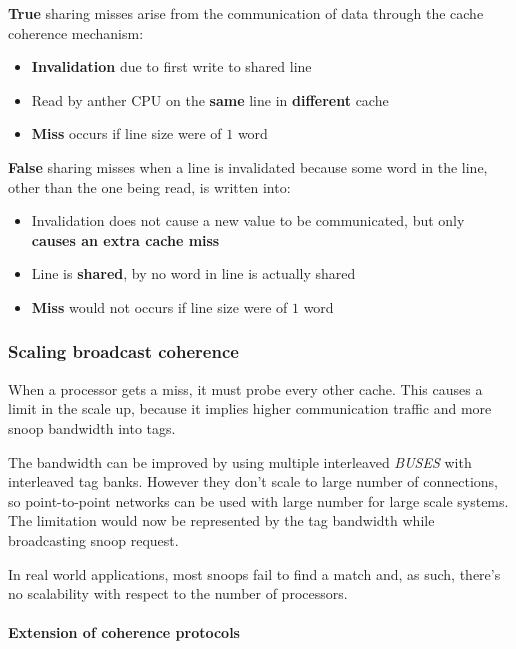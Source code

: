 \documentclass[english]{article}
\begin{document}
\bigskip
\textbf{True} sharing misses arise from the communication of data through the cache coherence mechanism:

\begin{itemize}
  \item \textbf{Invalidation} due to first write to shared line
  \item Read by anther CPU on the \textbf{same} line in \textbf{different} cache
  \item \textbf{Miss} occurs if line size were of \(1\) word
\end{itemize}

\textbf{False} sharing misses when a line is invalidated because some word in the line, other than the one being read, is written into:

\begin{itemize}
  \item Invalidation does not cause a new value to be communicated, but only \textbf{causes an extra cache miss}
  \item Line is \textbf{shared}, by no word in line is actually shared
  \item \textbf{Miss} would not occurs if line size were of \(1\) word
\end{itemize}

\subsubsection{Scaling broadcast coherence}

When a processor gets a miss, it must probe every other cache.
This causes a limit in the scale up, because it implies higher communication traffic and more snoop bandwidth into tags.

The bandwidth can be improved by using multiple interleaved \textit{BUSES} with interleaved tag banks.
However they don't scale to large number of connections, so point-to-point networks can be used with large number for large scale systems.
The limitation would now be represented by the tag bandwidth while broadcasting snoop request.

In real world applications, most snoops fail to find a match and, as such, there's no scalability with respect to the number of processors.

\paragraph{Extension of coherence protocols}
\end{document}
